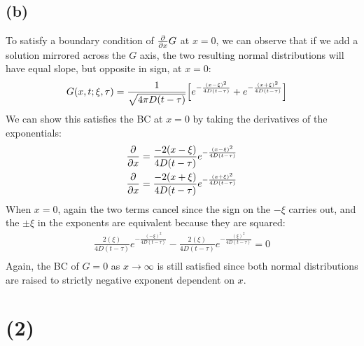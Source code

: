 \documentclass{article}
\begin{document}
\subsection*{\textbf{(b)}}
To satisfy a boundary condition of $\pdv{}{x}G$ at $x=0$, we can observe that if we add a solution mirrored across the $G$ axis, the two resulting normal distributions will have equal slope, but opposite in sign, at $x=0$:
\begin{equation}
\begin{aligned}
G(x, t;\xi, \tau) &= \frac{1}{\sqrt{4\pi D(t-\tau)}}\Big{[} e^{-\frac{(x-\xi)^2}{4D(t-\tau)}}+e^{-\frac{(x+\xi)^2}{4D(t-\tau)}}\Big{]}
\end{aligned}
\end{equation}
We can show this satisfies the BC at $x=0$ by taking the derivatives of the exponentials:
\begin{equation}
\begin{aligned}
\pdv{}{x}(e^{-\frac{(x-\xi)^2}{4 D(t-\tau)}}) = \frac{-2(x-\xi)}{4D(t-\tau)}e^{-\frac{(x-\xi)^2}{4D(t-\tau)}}\\
\pdv{}{x}(e^{-\frac{(x+\xi)^2}{4D(t-\tau)}}) = \frac{-2(x+\xi)}{4D(t-\tau)}e^{-\frac{(x+\xi)^2}{4D(t-\tau)}}\\
\end{aligned}
\end{equation}
When $x=0$, again the two terms cancel since the sign on the $-\xi$ carries out, and the $\pm\xi$ in the exponents are equivalent because they are squared:
\begin{equation}
\begin{aligned}
 \frac{2(\xi)}{4D(t-\tau)}e^{-\frac{(-\xi)^2}{4D(t-\tau)}} - \frac{2(\xi)}{4D(t-\tau)}e^{-\frac{(\xi)^2}{4D(t-\tau)}}=0\\
\end{aligned}
\end{equation}
Again, the BC of $G=0$ as $x\to\infty$ is still satisfied since both normal distributions are raised to strictly negative exponent dependent on $x$.
\section*{\textbf{(2)}}
\end{document}
